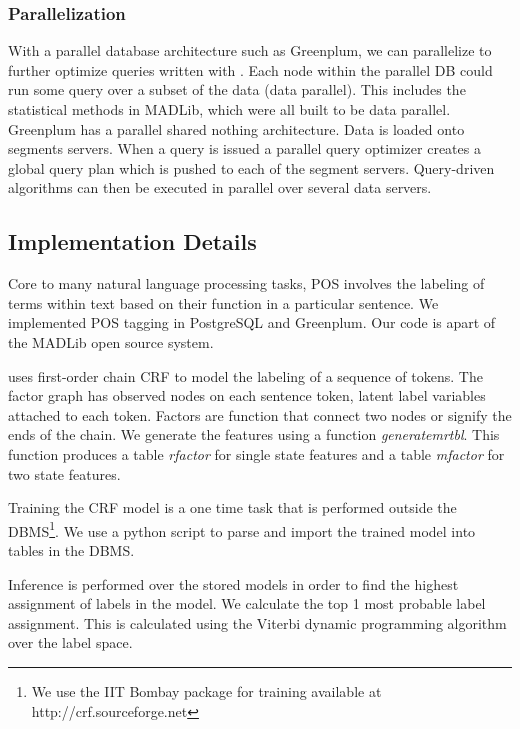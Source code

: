 \subsubsection*{Parallelization}
With a parallel database architecture such as 
Greenplum, we can parallelize to further optimize queries written
with {\system}. Each node within the parallel DB could run some query
over a subset of the data (data parallel). This includes the statistical methods
in MADLib, which were all built to be data parallel.
Greenplum has a parallel shared nothing architecture. Data is loaded onto 
segments servers. When a query is issued a parallel query optimizer 
creates a global query plan which is pushed to each of the segment servers.
Query-driven algorithms can then be executed in parallel over several
data servers.


\subsection{Implementation Details}
\label{sec:impdis}


Core to many natural language processing tasks, POS involves the
labeling of terms within text based on their function in a particular sentence.
We implemented POS tagging in PostgreSQL and Greenplum. 
Our code is apart of the MADLib open source system.

\system uses first-order chain CRF to model the labeling
of a sequence of tokens. The factor graph has observed nodes on each sentence
token, latent label variables attached to each token.
Factors are function that connect two nodes or signify the ends of the chain.
We generate the features using a function \textit{generatemrtbl}. 
This function produces a table \textit{rfactor} for single state features and a 
table \textit{mfactor} for two state features.

Training the CRF model is a one time task that is performed outside the 
DBMS\footnote{We use the IIT Bombay package for training available at 
http://crf.sourceforge.net }.
We use a python script to parse and import the trained model into 
tables in the DBMS. 

Inference is performed over the stored models in order to find the highest 
assignment of labels in the model.
We calculate the top 1 most probable label assignment. This is calculated using
the Viterbi dynamic programming algorithm over the label space.


